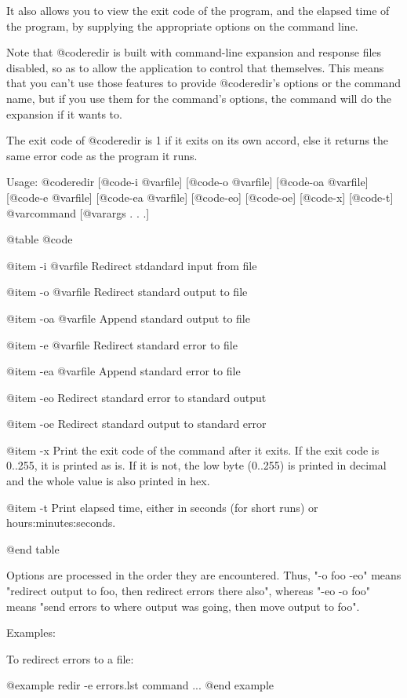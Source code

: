 It also allows you to view the exit code of the program, and the
elapsed time of the program, by supplying the appropriate options on
the command line.

Note that @code{redir} is built with command-line expansion and response files
disabled, so as to allow the application to control that themselves.
This means that you can't use those features to provide @code{redir}'s options
or the command name, but if you use them for the command's options, the
command will do the expansion if it wants to.

The exit code of @code{redir} is 1 if it exits on its own accord, else it
returns the same error code as the program it runs.

Usage: @code{redir} [@code{-i} @var{file}] [@code{-o} @var{file}]
[@code{-oa} @var{file}] [@code{-e} @var{file}] [@code{-ea} @var{file}]
[@code{-eo}] [@code{-oe}] [@code{-x}] [@code{-t}] @var{command}
[@var{args} . . .]

@table @code

@item -i @var{file}
Redirect stdandard input from file

@item -o @var{file}
Redirect standard output to file

@item -oa @var{file}
Append standard output to file

@item -e @var{file}
Redirect standard error to file

@item -ea @var{file}
Append standard error to file

@item -eo
Redirect standard error to standard output

@item -oe
Redirect standard output to standard error

@item -x
Print the exit code of the command after it exits.  If the exit code is
0..255, it is printed as is.  If it is not, the low byte (0..255) is
printed in decimal and the whole value is also printed in hex.

@item -t
Print elapsed time, either in seconds (for short runs) or
hours:minutes:seconds.

@end table

Options are processed in the order they are encountered.  Thus, "-o foo
-eo" means "redirect output to foo, then redirect errors there also",
whereas "-eo -o foo" means "send errors to where output was going, then
move output to foo".


Examples:

To redirect errors to a file:

@example
redir -e errors.lst command ...
@end example

